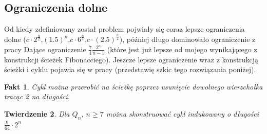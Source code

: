 \documentclass{pracamgr}
\newtheorem{theorem}{Twierdzenie}[chapter]
\newtheorem{fact}[theorem]{Fakt}
\begin{document}
    \subsection{Ograniczenia dolne}
     Od kiedy zdefiniowany został problem pojwiały się coraz lepsze ograniczenia dolne
     ($c\cdot2^{\frac{n}{2}}$,$(1.5)^{n}$,$c\cdot6^{\frac{n}{4}}$,$c\cdot(2.5)^{\frac{n}{2}}$), później długo dominowało ograniczenie z pracy \cite{Snake1}
     Dające ograniczenie $\frac{7}{4}\frac{2^n}{n-1}$ (które jest już lepsze od mojego wynikającego z konstrukcji ścieżek Fibonacciego).\newline
     Jeszcze lepsze ograniczenie wraz z konstrukcją ścieżki i cyklu pojawia się w pracy \cite{Snake2} (przedstawię szkic tego rozwiązania poniżej).
     \begin{fact}
      Cykl można przerobić na ścieżkę poprzez usunięcie dowolnego wierzchołka tracąc 2 na długości.
     \end{fact}
     \begin{theorem}\label{snake 9/64 2^n}
      Dla $Q_n$, $n\ge7$ można skonstruować cykl indukowany o długości $\frac{9}{64}\cdot2^n$
     \end{theorem}
\end{document}
